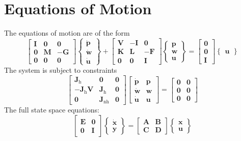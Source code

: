 \chapter{Equations of Motion}
The equations of motion are of the form
\[
\begin{bmatrix}
{\mathbf I} & {\bm 0} & {\bm 0} \\ {\bm 0} & {\mathbf M} & -{\mathbf G} \\ {\bm 0} & {\bm 0} & {\bm 0}
\end{bmatrix}
\begin{Bmatrix}
\dot{\bm p}\\ \dot{\bm w} \\ \dot{\bm u}
\end{Bmatrix}
+\begin{bmatrix}
{\mathbf V} & -{\mathbf I} & {\bm 0} \\ {\mathbf K} & {\mathbf L} & -{\mathbf F} \\ {\bm 0} & {\bm 0} & {\mathbf I}
\end{bmatrix}
\begin{Bmatrix}
{\bm p}\\ {\bm w}\\ {\bm u}
\end{Bmatrix}
=\begin{bmatrix}
{\bm 0}\\ {\bm 0}\\ {\mathbf I}
\end{bmatrix}
\begin{Bmatrix}
{\bm u}
\end{Bmatrix}
\]
The system is subject to constraints
\[
\begin{bmatrix}
\mathbf{J}_\textrm{h} & {\bm 0} & {\bm 0}\\-{\mathbf J}_\textrm{h}{\mathbf V} & {\mathbf J}_\textrm{h} & {\bm 0}\\ {\bm 0} & {\mathbf J}_\textrm{nh} & {\bm 0}
\end{bmatrix}
\begin{bmatrix}
\dot{\bm p} & {\bm p} \\ \dot{\bm w} & {\bm w} \\ \dot{\bm u} & {\bm u}
\end{bmatrix}
=\begin{bmatrix}
{\bm 0} & {\bm 0}\\{\bm 0} & {\bm 0}\\{\bm 0} & {\bm 0}
\end{bmatrix}
\]
\noindent The full state space equations:
\[
\begin{bmatrix}
{\mathbf E} & {\bm 0} \\ {\bm 0} & {\mathbf I}
\end{bmatrix}
\begin{Bmatrix}
\dot{\bm x}\\ {\bm y}
\end{Bmatrix}
=\begin{bmatrix}
\mathbf{A} & \mathbf{B} \\ \mathbf{C} & \mathbf{D}
\end{bmatrix}
\begin{Bmatrix}
{\bm x}\\ {\bm u}\end{Bmatrix}
\]
